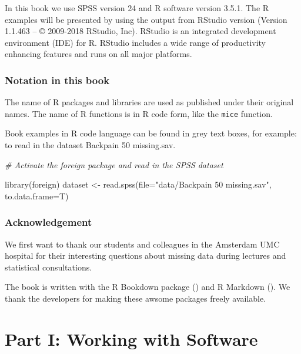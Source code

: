 \documentclass[
]{book}
\newenvironment{Shaded}{\begin{snugshade}}{\end{snugshade}}
\newcommand{\AttributeTok}[1]{\textcolor[rgb]{0.77,0.63,0.00}{#1}}
\newcommand{\CommentTok}[1]{\textcolor[rgb]{0.56,0.35,0.01}{\textit{#1}}}
\newcommand{\FunctionTok}[1]{\textcolor[rgb]{0.00,0.00,0.00}{#1}}
\newcommand{\NormalTok}[1]{#1}
\newcommand{\OtherTok}[1]{\textcolor[rgb]{0.56,0.35,0.01}{#1}}
\newcommand{\StringTok}[1]{\textcolor[rgb]{0.31,0.60,0.02}{#1}}
\begin{document}
In this book we use SPSS version 24 and R software version 3.5.1. The R examples will be presented by using the output from RStudio version (Version 1.1.463 -- © 2009-2018 RStudio, Inc). RStudio is an integrated development environment (IDE) for R. RStudio includes a wide range of productivity enhancing features and runs on all major platforms.

\hypertarget{notation-in-this-book}{%
\section*{Notation in this book}\label{notation-in-this-book}}

The name of R packages and libraries are used as published under their original names. The name of R functions is in R code form, like the \texttt{mice} function.

Book examples in R code language can be found in grey text boxes, for example:
to read in the dataset Backpain 50 missing.sav.

\begin{Shaded}
\begin{Highlighting}[]
\CommentTok{\# Activate the foreign package and read in the SPSS dataset}

\FunctionTok{library}\NormalTok{(foreign)}
\NormalTok{dataset }\OtherTok{\textless{}{-}} \FunctionTok{read.spss}\NormalTok{(}\AttributeTok{file=}\StringTok{"data/Backpain 50 missing.sav"}\NormalTok{, }\AttributeTok{to.data.frame=}\NormalTok{T)}
\end{Highlighting}
\end{Shaded}

\hypertarget{acknowledgement}{%
\section*{Acknowledgement}\label{acknowledgement}}

We first want to thank our students and colleagues in the Amsterdam UMC hospital for their interesting questions about missing data during lectures and statistical consultations.

The book is written with the R Bookdown package (\citet{R-bookdown}) and R Markdown (\citet{R-rmarkdown}). We thank the developers for making these awsome packages freely available.

\hypertarget{part-part-i-working-with-software}{%
\part{Part I: Working with Software}\label{part-part-i-working-with-software}}
\end{document}
